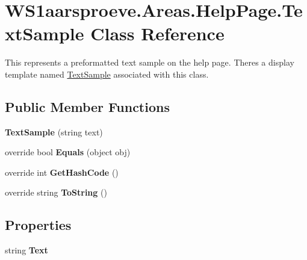 \hypertarget{class_w_s1aarsproeve_1_1_areas_1_1_help_page_1_1_text_sample}{}\section{W\+S1aarsproeve.\+Areas.\+Help\+Page.\+Text\+Sample Class Reference}
\label{class_w_s1aarsproeve_1_1_areas_1_1_help_page_1_1_text_sample}


This represents a preformatted text sample on the help page. There\textquotesingle{}s a display template named \hyperlink{class_w_s1aarsproeve_1_1_areas_1_1_help_page_1_1_text_sample}{Text\+Sample} associated with this class.  


\subsection*{Public Member Functions}
\begin{DoxyCompactItemize}
\item 
\hypertarget{class_w_s1aarsproeve_1_1_areas_1_1_help_page_1_1_text_sample_a84ab59064c466f35bff028cbb2286872}{}{\bfseries Text\+Sample} (string text)\label{class_w_s1aarsproeve_1_1_areas_1_1_help_page_1_1_text_sample_a84ab59064c466f35bff028cbb2286872}

\item 
\hypertarget{class_w_s1aarsproeve_1_1_areas_1_1_help_page_1_1_text_sample_a7c1b8a71f27e2a8643692a969d159cb8}{}override bool {\bfseries Equals} (object obj)\label{class_w_s1aarsproeve_1_1_areas_1_1_help_page_1_1_text_sample_a7c1b8a71f27e2a8643692a969d159cb8}

\item 
\hypertarget{class_w_s1aarsproeve_1_1_areas_1_1_help_page_1_1_text_sample_a45e333d1274684d7aa12dec25a875211}{}override int {\bfseries Get\+Hash\+Code} ()\label{class_w_s1aarsproeve_1_1_areas_1_1_help_page_1_1_text_sample_a45e333d1274684d7aa12dec25a875211}

\item 
\hypertarget{class_w_s1aarsproeve_1_1_areas_1_1_help_page_1_1_text_sample_a00013d1e738591e006a544503198eba6}{}override string {\bfseries To\+String} ()\label{class_w_s1aarsproeve_1_1_areas_1_1_help_page_1_1_text_sample_a00013d1e738591e006a544503198eba6}

\end{DoxyCompactItemize}
\subsection*{Properties}
\begin{DoxyCompactItemize}
\item 
\hypertarget{class_w_s1aarsproeve_1_1_areas_1_1_help_page_1_1_text_sample_ab1aa50a39596a5bd75b5127e29adf55f}{}string {\bfseries Text}\label{class_w_s1aarsproeve_1_1_areas_1_1_help_page_1_1_text_sample_ab1aa50a39596a5bd75b5127e29adf55f}

\end{DoxyCompactItemize}


